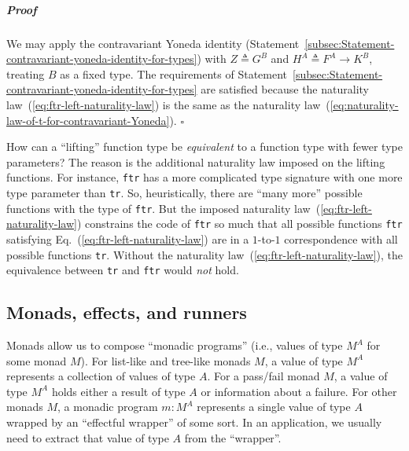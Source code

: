 \subparagraph{Proof}

We may apply the contravariant Yoneda identity (Statement~\ref{subsec:Statement-contravariant-yoneda-identity-for-types})
with $Z\triangleq G^{B}$ and $H^{A}\triangleq F^{A}\rightarrow K^{B}$,
treating $B$ as a fixed type. The requirements of Statement~\ref{subsec:Statement-contravariant-yoneda-identity-for-types}
are satisfied because the naturality law~(\ref{eq:ftr-left-naturality-law})
is the same as the naturality law~(\ref{eq:naturality-law-of-t-for-contravariant-Yoneda}).
$\square$

How can a \textsf{``}lifting\textsf{''} function type be \emph{equivalent} to a function
type with fewer type parameters? The reason is the additional naturality
law imposed on the lifting functions. For instance, \lstinline!ftr!
has a more complicated type signature with one more type parameter
than \lstinline!tr!. So, heuristically, there are \textsf{``}many more\textsf{''}
possible functions with the type of \lstinline!ftr!. But the imposed
naturality law~(\ref{eq:ftr-left-naturality-law}) constrains the
code of \lstinline!ftr! so much that all possible functions \lstinline!ftr!
satisfying Eq.~(\ref{eq:ftr-left-naturality-law}) are in a $1$-to-$1$
correspondence with all possible functions \lstinline!tr!. Without
the naturality law~(\ref{eq:ftr-left-naturality-law}), the equivalence
between \lstinline!tr! and \lstinline!ftr! would \emph{not} hold. 

\subsection{Monads, effects, and runners}

Monads allow us to compose \textsf{``}monadic programs\textsf{''}
(i.e., values of type $M^{A}$ for some monad $M$). For list-like
and tree-like monads $M$, a value of type $M^{A}$ represents a collection
of values of type $A$. For a pass/fail monad $M$, a value of type
$M^{A}$ holds either a result of type $A$ or information about a
failure. For other monads $M$, a monadic program $m:M^{A}$ represents
a single value of type $A$ wrapped by an \textsf{``}effectful wrapper\textsf{''}
of some sort. In an application, we usually need to extract that value
of type $A$ from the \textsf{``}wrapper\textsf{''}.

